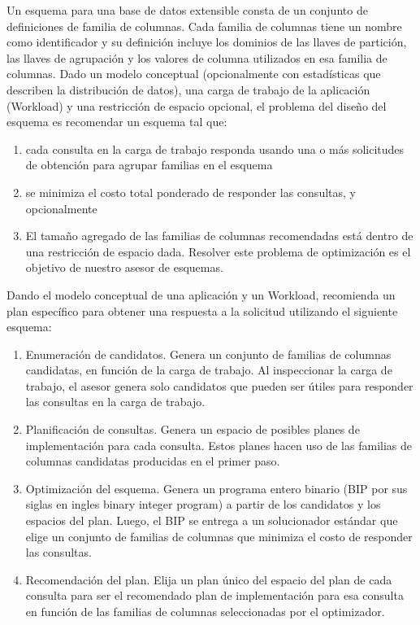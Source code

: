 Un esquema para una base de datos extensible consta de un conjunto de definiciones de familia de columnas. Cada familia de columnas tiene un nombre como identificador y su definición incluye los dominios de las llaves de partición, las llaves de agrupación y los valores de columna utilizados en esa familia de columnas.
Dado un modelo conceptual (opcionalmente con estadísticas que describen la distribución de datos), una carga de trabajo de la aplicación (Workload) y una restricción de espacio opcional, el problema del diseño del esquema es recomendar un esquema tal que:
\begin{enumerate}
    \item cada consulta en la carga de trabajo responda usando una o más solicitudes de obtención para agrupar familias en el esquema
    \item se minimiza el costo total ponderado de responder las consultas, y opcionalmente 
    \item El tamaño agregado de las familias de columnas recomendadas está dentro de una restricción de espacio dada. Resolver este problema de optimización es el objetivo de nuestro asesor de esquemas. 
\end{enumerate}
Dando el modelo conceptual de una aplicación y un Workload,  recomienda un plan específico para obtener una respuesta a la solicitud utilizando el siguiente esquema:
\begin{enumerate}
    \item Enumeración de candidatos. Genera un conjunto de familias de columnas candidatas, en función de la carga de trabajo. Al inspeccionar la carga de trabajo, el asesor genera solo candidatos que pueden ser útiles para responder las consultas en la carga de trabajo.
    \item Planificación de consultas. Genera un espacio de posibles planes de implementación para cada consulta. Estos planes hacen uso de las familias de columnas candidatas producidas en el primer paso.
    \item Optimización del esquema. Genera un programa entero binario (BIP por sus siglas en ingles binary integer program) a partir de los candidatos y los espacios del plan. Luego, el BIP se entrega a un solucionador estándar que elige un conjunto de familias de columnas que minimiza el costo de responder las consultas.
    \item Recomendación del plan. Elija un plan único del espacio del plan de cada consulta para ser el recomendado plan de implementación para esa consulta en función de las familias de columnas seleccionadas por el optimizador.        
\end{enumerate}